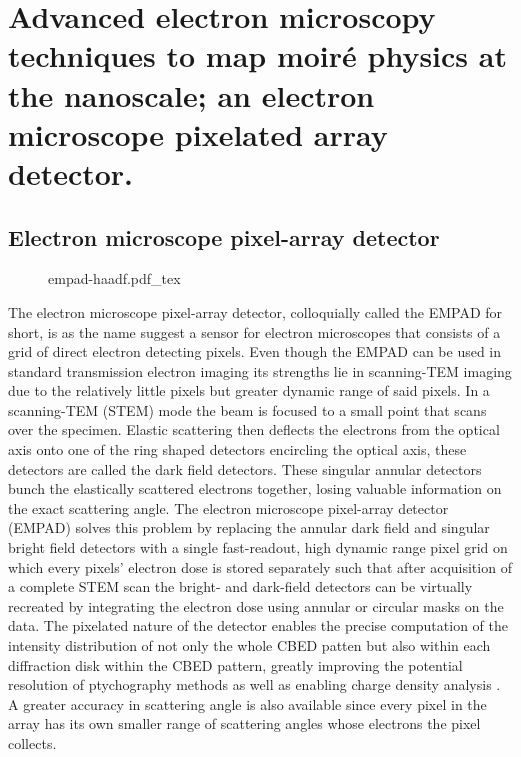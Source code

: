 \newpage
\section{Advanced electron microscopy techniques to map moiré physics at the nanoscale; an electron microscope pixelated array detector.}

\subsection{Electron microscope pixel-array detector}

\begin{figure}[h]
	\centering
	\def\svgwidth{0.5\linewidth}
	{empad-haadf.pdf_tex}
	\caption{}
	\label{fig:empad_haadf_comparison}
\end{figure}
The electron microscope pixel-array detector, colloquially called the EMPAD for short, is as the name suggest a sensor for electron microscopes that consists of a grid of direct electron detecting pixels. Even though the EMPAD can be used in standard transmission electron imaging its strengths lie in scanning-TEM imaging due to the relatively little pixels but greater dynamic range of said pixels.
In a scanning-TEM (STEM) mode the beam is focused to a small point that scans over the specimen. Elastic scattering then deflects the electrons from the optical axis onto one of the ring shaped detectors encircling the optical axis, these detectors are called the dark field detectors. These singular annular detectors bunch the elastically scattered electrons together, losing valuable information on the exact scattering angle. The electron microscope pixel-array detector (EMPAD) solves this problem by replacing the annular dark field and singular bright field detectors with a single fast-readout, high dynamic range pixel grid on which every pixels' electron dose is stored separately such that after acquisition of a complete STEM scan the bright- and dark-field detectors can be virtually recreated by integrating the electron dose using annular or circular masks on the data.
The pixelated nature of the detector enables the precise computation of the intensity distribution of not only the whole CBED patten but also within each diffraction disk within the CBED pattern, greatly improving the potential resolution of ptychography methods \cite{pennycookEfficientPhaseContrast2015, yangEfficientPhaseContrast2015a} as well as enabling charge density analysis \cite{hachtelSubAngstromElectricField2018,wenMapping1DConfined2022,fangAtomicElectrostaticMaps2019}.
A greater accuracy in scattering angle is also available since every pixel in the array has its own smaller range of scattering angles whose electrons the pixel collects.


